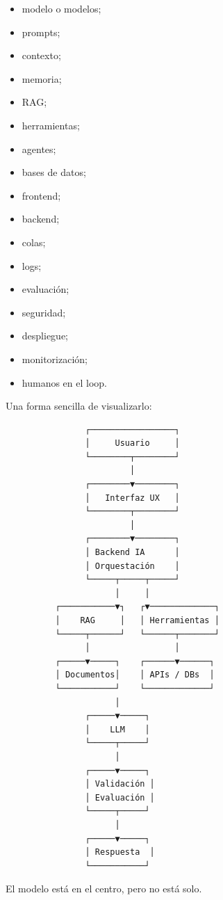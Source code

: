\begin{itemize}
\tightlist
\item
  modelo o modelos;
\item
  prompts;
\item
  contexto;
\item
  memoria;
\item
  RAG;
\item
  herramientas;
\item
  agentes;
\item
  bases de datos;
\item
  frontend;
\item
  backend;
\item
  colas;
\item
  logs;
\item
  evaluación;
\item
  seguridad;
\item
  despliegue;
\item
  monitorización;
\item
  humanos en el loop.
\end{itemize}

Una forma sencilla de visualizarlo:

\begin{lstlisting}
                ┌─────────────────┐
                │     Usuario     │
                └────────┬────────┘
                         │
                ┌────────▼────────┐
                │   Interfaz UX   │
                └────────┬────────┘
                         │
                ┌────────▼────────┐
                │ Backend IA      │
                │ Orquestación    │
                └─────┬─────┬─────┘
                      │     │
          ┌───────────▼┐   ┌▼─────────────┐
          │    RAG     │   │ Herramientas │
          └─────┬──────┘   └──────┬───────┘
                │                 │
          ┌─────▼─────┐    ┌──────▼──────┐
          │ Documentos│    │ APIs / DBs  │
          └───────────┘    └─────────────┘
                      │
                ┌─────▼─────┐
                │    LLM    │
                └─────┬─────┘
                      │
                ┌─────▼─────┐
                │ Validación │
                │ Evaluación │
                └─────┬─────┘
                      │
                ┌─────▼─────┐
                │ Respuesta  │
                └───────────┘
\end{lstlisting}

El modelo está en el centro, pero no está solo.

